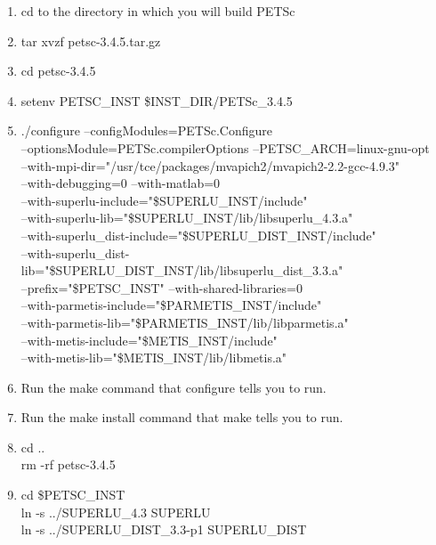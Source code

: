 \documentclass[11pt]{amsart}
\begin{document}
\begin{enumerate}
\item cd to the directory in which you will build PETSc
\item tar xvzf petsc-3.4.5.tar.gz
\item cd petsc-3.4.5
\item setenv PETSC\_INST \$INST\_DIR/PETSc\_3.4.5
\item ./configure --configModules=PETSc.Configure \\
--optionsModule=PETSc.compilerOptions --PETSC\_ARCH=linux-gnu-opt \\
--with-mpi-dir="/usr/tce/packages/mvapich2/mvapich2-2.2-gcc-4.9.3" \\
--with-debugging=0 --with-matlab=0 \\
--with-superlu-include="\$SUPERLU\_INST/include" \\
--with-superlu-lib="\$SUPERLU\_INST/lib/libsuperlu\_4.3.a" \\
--with-superlu\_dist-include="\$SUPERLU\_DIST\_INST/include" \\
--with-superlu\_dist-lib="\$SUPERLU\_DIST\_INST/lib/libsuperlu\_dist\_3.3.a" \\
--prefix="\$PETSC\_INST" --with-shared-libraries=0 \\
--with-parmetis-include="\$PARMETIS\_INST/include" \\
--with-parmetis-lib="\$PARMETIS\_INST/lib/libparmetis.a" \\
--with-metis-include="\$METIS\_INST/include" \\
--with-metis-lib="\$METIS\_INST/lib/libmetis.a"
\item Run the make command that configure tells you to run.
\item Run the make install command that make tells you to run.
\item cd .. \\
rm -rf petsc-3.4.5
\item cd \$PETSC\_INST \\
ln -s ../SUPERLU\_4.3 SUPERLU \\
ln -s ../SUPERLU\_DIST\_3.3-p1 SUPERLU\_DIST
\end{enumerate}
\end{document}
